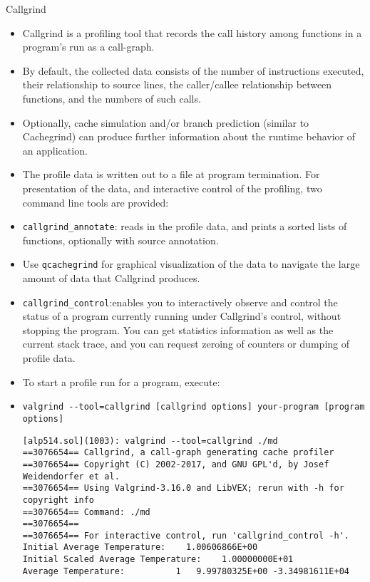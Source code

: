 \documentclass[10pt,t]{beamer}
\begin{document}
\begin{frame}{Callgrind}
  \begin{itemize}
    \item Callgrind is a profiling tool that records the call history among functions in a program's run as a call-graph.
    \item By default, the collected data consists of the number of instructions executed, their relationship to source lines, the caller/callee relationship between functions, and the numbers of such calls.
    \item Optionally, cache simulation and/or branch prediction (similar to Cachegrind) can produce further information about the runtime behavior of an application.
    \item The profile data is written out to a file at program termination. For presentation of the data, and interactive control of the profiling, two command line tools are provided:
    \item \lstinline|callgrind_annotate|: reads in the profile data, and prints a sorted lists of functions, optionally with source annotation.
    \item Use \lstinline|qcachegrind| for graphical visualization of the data to navigate the large amount of data that Callgrind produces.
    \item \lstinline|callgrind_control|:enables you to interactively observe and control the status of a program currently running under Callgrind's control, without stopping the program. You can get statistics information as well as the current stack trace, and you can request zeroing of counters or dumping of profile data.
    \item To start a profile run for a program, execute:
    \item[] \lstinline|valgrind --tool=callgrind [callgrind options] your-program [program options]|
      \begin{lstlisting}[basicstyle=\fontsize{4.5}{5.5}\selectfont\ttfamily]
[alp514.sol](1003): valgrind --tool=callgrind ./md
==3076654== Callgrind, a call-graph generating cache profiler
==3076654== Copyright (C) 2002-2017, and GNU GPL'd, by Josef Weidendorfer et al.
==3076654== Using Valgrind-3.16.0 and LibVEX; rerun with -h for copyright info
==3076654== Command: ./md
==3076654==
==3076654== For interactive control, run 'callgrind_control -h'.
Initial Average Temperature:    1.00606866E+00
Initial Scaled Average Temperature:    1.00000000E+01
Average Temperature:          1   9.99780325E+00 -3.34981611E+04

\end{lstlisting}
\end{itemize}
\end{frame}
\end{document}
